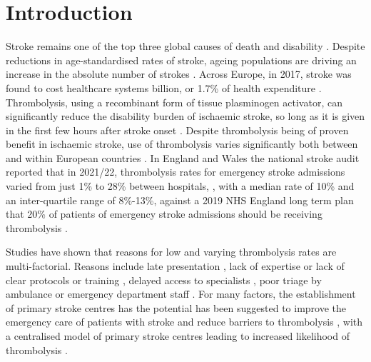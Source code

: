 \section{Introduction}



Stroke remains one of the top three global causes of death and disability \cite{feigin_global_2021}. Despite reductions in age-standardised rates of stroke, ageing populations are driving an increase in the absolute number of strokes \cite{feigin_global_2021}. Across Europe, in 2017, stroke was found to cost healthcare systems  billion, or 1.7\% of health expenditure \cite{luengo-fernandez_economic_2020}. Thrombolysis, using a recombinant form of tissue plasminogen activator, can significantly reduce the disability burden of ischaemic stroke, so long as it is given in the first few hours after stroke onset \cite{emberson_effect_2014}. Despite thrombolysis being of proven benefit in ischaemic stroke, use of thrombolysis varies significantly both between and within European countries \cite{aguiar_de_sousa_access_2019}. In England and Wales the national stroke audit reported that in 2021/22, thrombolysis rates for emergency stroke admissions varied from just 1\% to 28\% between hospitals, \cite{sentinel_national_stroke_audit_programme_ssnap_2022}, with a median rate of 10\% and an inter-quartile range of 8\%-13\%, against a 2019 NHS England long term plan that 20\% of patients of emergency stroke admissions should be receiving thrombolysis \cite{nhs_long_term_plan_2019}.


Studies have shown that reasons for low and varying thrombolysis rates are multi-factorial. Reasons include late presentation \cite{aguiar_de_sousa_access_2019}, lack of expertise \cite{aguiar_de_sousa_access_2019} or lack of clear protocols or training \cite{carter-jones_stroke_2011}, delayed access to specialists \cite{kamal_delays_2017}, poor triage by ambulance or emergency department staff \cite{carter-jones_stroke_2011}. For many factors, the establishment of primary stroke centres has the potential has been suggested to improve the emergency care of patients with stroke and reduce barriers to thrombolysis \cite{carter-jones_stroke_2011}, with a centralised model of primary stroke centres leading to increased likelihood of thrombolysis \cite{lahr_proportion_2012, morris_impact_2014, hunter_impact_2013}. 

